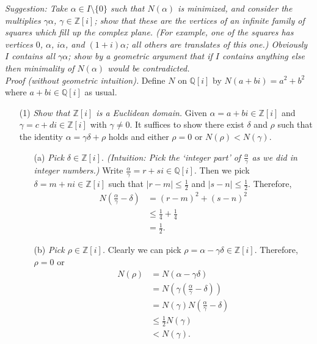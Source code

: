\documentclass{article}
\begin{document}
\emph{Suggestion: Take $\alpha \in I \setminus \{0\}$ such that $N(\alpha)$ is minimized,
and consider the multiplies $\gamma\alpha$, $\gamma \in \mathbb{Z}[i]$;
show that these are the vertices of an infinite family of squares which
fill up the complex plane.
(For example,
one of the squares has vertices $0$, $\alpha$, $i\alpha$, and $(1+i)\alpha$;
all others are translates of this one.)
Obviously $I$ contains all $\gamma\alpha$;
show by a geometric argument that if $I$ contains anything else then
minimality of $N(\alpha)$ would be contradicted.} \\

\emph{Proof (without geometric intuition).}
Define $N$ on $\mathbb{Q}[i]$ by $N(a+bi) = a^2+b^2$ where
$a+bi \in \mathbb{Q}[i]$ as usual.
\begin{enumerate}
\item[(1)]
\emph{Show that $\mathbb{Z}[i]$ is a Euclidean domain.}
Given $\alpha = a+bi \in \mathbb{Z}[i]$ and
$\gamma = c+di \in \mathbb{Z}[i]$ with $\gamma \neq 0$.
It suffices to show there exist $\delta$ and $\rho$ such that the identity
$\alpha = \gamma\delta + \rho$ holds and
either $\rho = 0$ or $N(\rho) < N(\gamma)$.
\begin{enumerate}
\item[(a)]
\emph{Pick $\delta \in \mathbb{Z}[i].$
(Intuition: Pick the `integer part' of $\frac{\alpha}{\gamma}$
as we did in integer numbers.)}
Write $\frac{\alpha}{\gamma} = r+si \in \mathbb{Q}[i]$.
Then we pick $\delta = m+ni \in \mathbb{Z}[i]$ such that
$|r-m| \leq \frac{1}{2}$ and $|s-n| \leq \frac{1}{2}$.
Therefore,
\begin{align*}
N\left( \frac{\alpha}{\gamma} - \delta \right)
&= (r-m)^2 + (s-n)^2 \\
&\leq \frac{1}{4} + \frac{1}{4} \\
&= \frac{1}{2}.
\end{align*}
\item[(b)]
\emph{Pick $\rho \in \mathbb{Z}[i]$.}
Clearly we can pick $\rho = \alpha - \gamma\delta \in \mathbb{Z}[i]$.
Therefore, $\rho = 0$ or
\begin{align*}
N(\rho)
&= N(\alpha - \gamma\delta) \\
&= N\left( \gamma\left( \frac{\alpha}{\gamma} - \delta \right) \right) \\
&= N(\gamma) N\left( \frac{\alpha}{\gamma} - \delta \right) \\
&\leq \frac{1}{2} N(\gamma) \\
&< N(\gamma).
\end{align*}

\end{enumerate}
\end{enumerate}
\end{document}
